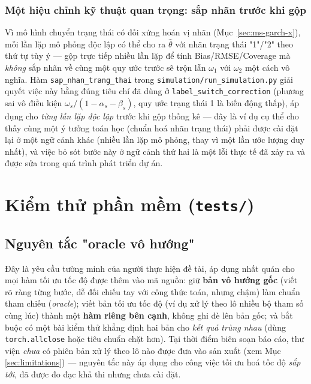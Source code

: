 \documentclass[11pt,a4paper]{article}
\newcommand{\code}[1]{\texttt{#1}}
\newcommand{\file}[1]{\texttt{#1}}
\begin{document}
\subsubsection{Một hiệu chỉnh kỹ thuật quan trọng: sắp nhãn trước khi gộp}

Vì mô hình chuyển trạng thái có đối xứng hoán vị nhãn (Mục~\ref{sec:ms-garch-x}), mỗi
lần lặp mô phỏng độc lập có thể cho ra $\hat\theta$ với nhãn trạng thái "1"/"2" theo
thứ tự tùy ý --- gộp trực tiếp nhiều lần lặp để tính Bias/RMSE/Coverage mà
\emph{không} sắp nhãn về cùng một quy ước trước sẽ trộn lẫn $\omega_1$ với $\omega_2$
một cách vô nghĩa. Hàm \code{sap\_nhan\_trang\_thai} trong
\file{simulation/run\_simulation.py} giải quyết việc này bằng đúng tiêu chí đã dùng ở
\code{label\_switch\_correction} (phương sai vô điều kiện $\omega_s/(1-\alpha_s
-\beta_s)$, quy ước trạng thái 1 là biến động thấp), áp dụng cho \emph{từng lần lặp
độc lập} trước khi gộp thống kê --- đây là ví dụ cụ thể cho thấy cùng một ý tưởng
toán học (chuẩn hoá nhãn trạng thái) phải được cài đặt lại ở một ngữ cảnh khác
(nhiều lần lặp mô phỏng, thay vì một lần ước lượng duy nhất), và việc bỏ sót bước
này ở ngữ cảnh thứ hai là một lỗi thực tế đã xảy ra và được sửa trong quá trình phát
triển dự án.

\section{Kiểm thử phần mềm (\file{tests/})}

\subsection{Nguyên tắc "oracle vô hướng"}

Đây là yêu cầu tường minh của người thực hiện đề tài, áp dụng nhất quán cho mọi hàm
tối ưu tốc độ được thêm vào mã nguồn: giữ \textbf{bản vô hướng gốc} (viết rõ ràng
từng bước, dễ đối chiếu tay với công thức toán, nhưng chậm) làm chuẩn tham chiếu
(\emph{oracle}); viết bản tối ưu tốc độ (ví dụ xử lý theo lô nhiều bộ tham số cùng
lúc) thành một \textbf{hàm riêng bên cạnh}, không ghi đè lên bản gốc; và bắt buộc có
một bài kiểm thử khẳng định hai bản cho \emph{kết quả trùng nhau} (dùng
\code{torch.allclose} hoặc tiêu chuẩn chặt hơn). Tại thời điểm biên soạn báo cáo,
thư viện \emph{chưa} có phiên bản xử lý theo lô nào được đưa vào sản xuất (xem Mục
\ref{sec:limitations}) --- nguyên tắc này áp dụng cho công việc tối ưu hoá tốc độ
\emph{sắp tới}, đã được đo đạc khả thi nhưng chưa cài đặt.
\end{document}
